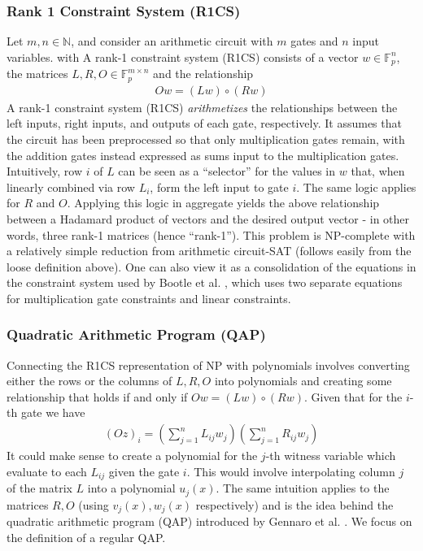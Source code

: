 \subsubsection{Rank 1 Constraint System (R1CS)}
Let $m, n \in \mathbb{N}$, and consider an arithmetic circuit with $m$ gates and $n$ input variables. with A rank-1 constraint system (R1CS) consists of a vector $w \in \mathbb{F}_{p}^{n}$, the matrices $L, R, O \in \mathbb{F}_{p}^{m \times n}$ and the relationship
\begin{align}
Ow = (Lw) \circ (Rw)
\end{align}
A rank-1 constraint system (R1CS) \textit{arithmetizes} the relationships between the left inputs, right inputs, and outputs of each gate, respectively. It assumes that the circuit has been preprocessed so that only multiplication gates remain, with the addition gates instead expressed as sums input to the multiplication gates. Intuitively, row $i$ of $L$ can be seen as a ``selector'' for the values in $w$ that, when linearly combined via row $L_i$, form the left input to gate $i$. The same logic applies for $R$ and $O$. Applying this logic in aggregate yields the above relationship between a Hadamard product of vectors and the desired output vector - in other words, three rank-1 matrices (hence ``rank-1''). This problem is NP-complete with a relatively simple reduction from arithmetic circuit-SAT (follows easily from the loose definition above). One can also view it as a consolidation of the equations in the constraint system used by Bootle et al. \cite{bootlezkargs}, which uses two separate equations for multiplication gate constraints and linear constraints.

\subsubsection{Quadratic Arithmetic Program (QAP)}
Connecting the R1CS representation of NP with polynomials involves converting either the rows or the columns of $L, R, O$ into polynomials and creating some relationship that holds if and only if $Ow = (Lw) \circ (Rw)$. Given that for the $i$-th gate we have
\begin{align}
(Oz)_i = \left(\sum_{j=1}^n L_{ij}w_j\right)\left(\sum_{j=1}^n R_{ij}w_j\right)
\end{align}
It could make sense to create a polynomial for the $j$-th witness variable which evaluate to each $L_{ij}$ given the gate $i$. This would involve interpolating column $j$ of the matrix $L$ into a polynomial $u_j(x)$. The same intuition applies to the matrices $R, O$ (using $v_j(x), w_j(x)$ respectively) and is the idea behind the quadratic arithmetic program (QAP) introduced by Gennaro et al. \cite{snarknopcp}. We focus on the definition of a regular QAP.

